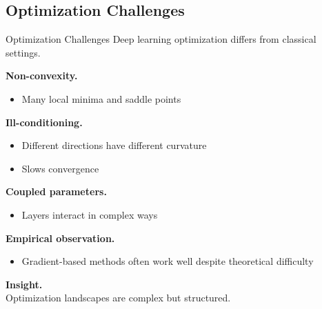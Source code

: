 \documentclass[aspectratio=169,11pt]{beamer}
\begin{document}
\subsection{Optimization Challenges}
\begin{frame}[t,allowframebreaks]{Optimization Challenges}
\small
Deep learning optimization differs from classical settings.

\textbf{Non-convexity.}\\ \begin{itemize}
    \item Many local minima and saddle points
\end{itemize}

\textbf{Ill-conditioning.}\\ \begin{itemize}
    \item Different directions have different curvature
    \item Slows convergence
\end{itemize}

\textbf{Coupled parameters.}\\ \begin{itemize}
    \item Layers interact in complex ways
\end{itemize}

\textbf{Empirical observation.}\\ \begin{itemize}
    \item Gradient-based methods often work well despite theoretical difficulty
\end{itemize}

\textbf{Insight.}\\ Optimization landscapes are complex but structured.
\end{frame}
\end{document}
